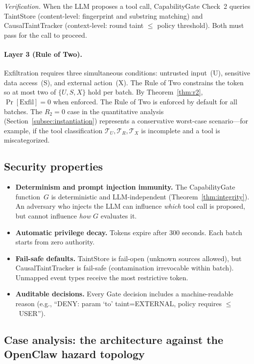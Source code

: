 \documentclass[pdflatex,sn-nature]{sn-jnl}%
\theoremstyle{thmstyleone}%
\theoremstyle{thmstyletwo}%
\theoremstyle{thmstylethree}%
\begin{document}
\emph{Verification.} When the LLM proposes a tool call, CapabilityGate Check~2 queries TaintStore (content-level: fingerprint and substring matching) and CausalTaintTracker (context-level: round taint $\leq$ policy threshold). Both must pass for the call to proceed.

\paragraph{Layer 3 (Rule of Two).} Exfiltration requires three simultaneous conditions: untrusted input~(U), sensitive data access~(S), and external action~(X). The Rule of Two constrains the token so at most two of $\{U, S, X\}$ hold per batch. By Theorem~\ref{thm:r2}, $\Pr[\text{Exfil}] = 0$ when enforced. The Rule of Two is enforced by default for all batches. The $R_2 = 0$ case in the quantitative analysis (Section~\ref{subsec:instantiation}) represents a conservative worst-case scenario---for example, if the tool classification $\mathcal{T}_U, \mathcal{T}_R, \mathcal{T}_X$ is incomplete and a tool is miscategorized.

\subsection{Security properties}\label{subsec:properties}

\begin{itemize}
  \item \textbf{Determinism and prompt injection immunity.} The CapabilityGate function~$G$ is deterministic and LLM-independent (Theorem~\ref{thm:integrity}). An adversary who injects the LLM can influence \emph{which} tool call is proposed, but cannot influence \emph{how} $G$ evaluates it.
  \item \textbf{Automatic privilege decay.} Tokens expire after 300 seconds. Each batch starts from zero authority.
  \item \textbf{Fail-safe defaults.} TaintStore is fail-open (unknown sources allowed), but CausalTaintTracker is fail-safe (contamination irrevocable within batch). Unmapped event types receive the most restrictive token.
  \item \textbf{Auditable decisions.} Every Gate decision includes a machine-readable reason (e.g., ``DENY: param `to' taint=EXTERNAL, policy requires $\leq$~USER'').
\end{itemize}

\subsection{Case analysis: the architecture against the OpenClaw hazard topology}\label{subsec:case}
\end{document}
